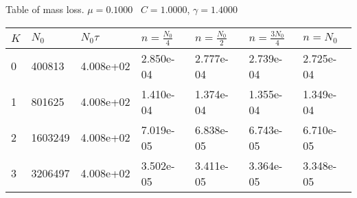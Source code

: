 \begin{center}
Table of mass loss. $\mu = 0.1000$ \, $C = 1.0000$, $\gamma = 1.4000$
  
\begin{tabular}{|p{0.8in}|p{0.8in}|p{0.8in}|p{0.8in}|p{0.8in}|p{0.8in}|p{0.8in}|} \hline
$K$ &$N_0$ &$N_0 \tau$ &$n = \frac{N_0}{4}$ &$n = \frac{N_0}{2}$ &$n = \frac{3N_0}{4}$ &$n = N_0$ \\ \hline 
0 &400813 &4.008e+02 &2.850e-04 &2.777e-04 &2.739e-04 &2.725e-04 \\ \hline 
1 &801625 &4.008e+02 &1.410e-04 &1.374e-04 &1.355e-04 &1.349e-04 \\ \hline 
2 &1603249 &4.008e+02 &7.019e-05 &6.838e-05 &6.743e-05 &6.710e-05 \\ \hline 
3 &3206497 &4.008e+02 &3.502e-05 &3.411e-05 &3.364e-05 &3.348e-05 \\ \hline 

\end{tabular}\\[20pt]
\end{center}
